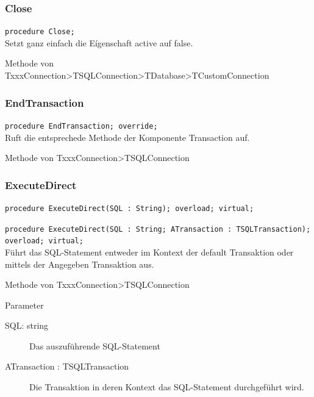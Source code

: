 \subsubsection{Close}
\begin{description}
  \item \texttt{procedure Close;}\\Setzt ganz einfach die Eígenschaft active auf false.
  \begin{description}
    \item Methode von TxxxConnection>TSQLConnection>TDatabase>TCustomConnection
  \end{description}
\end{description}

\subsubsection{EndTransaction}
\begin{description}
  \item \texttt{procedure EndTransaction; override;}\\Ruft die entsprechede Methode der Komponente Transaction auf.
  \begin{description}
    \item Methode von TxxxConnection>TSQLConnection
  \end{description}
\end{description}

\subsubsection{ExecuteDirect}
\begin{description}
  \item \texttt{procedure ExecuteDirect(SQL : String); overload; virtual;}
  \item \texttt{procedure ExecuteDirect(SQL : String; ATransaction : TSQLTransaction); overload; virtual;}\\Führt das SQL-Statement entweder im Kontext der default Transaktion oder mittels der Angegeben Transaktion aus.
  \begin{description}
    \item Methode von TxxxConnection>TSQLConnection
  \end{description}
  \begin{description}
    \item Parameter
    \begin{description}
      \item[SQL: string] Das auszuführende SQL-Statement
      \item[ATransaction : TSQLTransaction] Die Transaktion in deren Kontext das SQL-Statement durchgeführt wird. 
    \end{description}
  \end{description}
\end{description}

